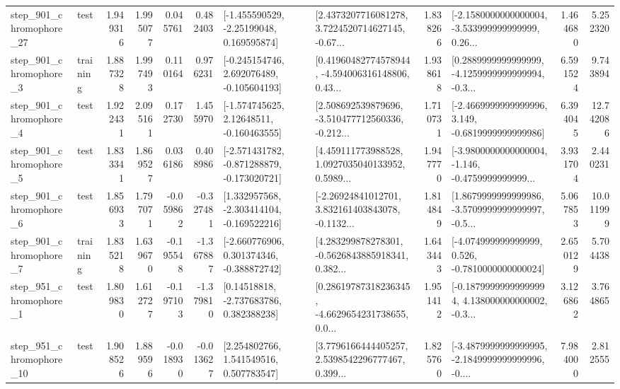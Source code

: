 \begin{tabular}{llrrrrllrlrr}
  step\_901\_chromophore\_27 &      test &      1.949316 &    1.995077 &      0.045761 &  0.482403 &    [-1.455590529, -2.25199048, 0.169595874] &  [2.4373207716081278, 3.7224520714627145, -0.67... &       1.838266 &  [-2.1580000000000004, -3.533999999999999, 0.26... &            1.464680 &          5.252320 \\
   step\_901\_chromophore\_3 &  training &      1.887328 &    1.997493 &      0.110164 &  0.976231 &   [-0.245154746, 2.692076489, -0.105604193] &  [0.41960482774578944, -4.594006316148806, 0.43... &       1.938618 &  [0.2889999999999999, -4.1259999999999994, -0.3... &            6.591524 &          9.743894 \\
   step\_901\_chromophore\_4 &      test &      1.922431 &    2.095161 &      0.172730 &  1.455970 &    [-1.574745625, 2.12648511, -0.160463555] &  [2.508692539879696, -3.510477712560336, -0.212... &       1.710731 &  [-2.4669999999999996, 3.149, -0.6819999999999986] &            6.394045 &         12.742086 \\
   step\_901\_chromophore\_5 &      test &      1.833341 &    1.869527 &      0.036186 &  0.408986 &  [-2.571431782, -0.871288879, -0.173020721] &  [4.459111773988528, 1.0927035040133952, 0.5989... &       1.947770 &  [-3.9800000000000004, -1.146, -0.4759999999999... &            3.931704 &          2.440231 \\
   step\_901\_chromophore\_6 &      test &      1.856933 &    1.797071 &     -0.059862 & -0.327481 &   [1.332957568, -2.303414104, -0.169522216] &  [-2.26924841012701, 3.832161403843078, -0.1132... &       1.814849 &  [1.8679999999999986, -3.5709999999999997, -0.5... &            5.067853 &         10.011999 \\
   step\_901\_chromophore\_7 &  training &      1.835218 &    1.639670 &     -0.195548 & -1.367887 &   [-2.660776906, 0.301374346, -0.388872742] &  [4.283299878278301, -0.5626843885918341, 0.382... &       1.643443 &   [-4.074999999999999, 0.526, -0.7810000000000024] &            2.650129 &          5.704438 \\
   step\_951\_chromophore\_1 &      test &      1.809830 &    1.612727 &     -0.197103 & -1.379810 &     [0.14518818, -2.737683786, 0.382388238] &  [0.28619787318236345, -4.6629654231738655, 0.0... &       1.951412 &  [-0.18799999999999994, 4.138000000000002, -0.3... &            3.126862 &          3.764865 \\
  step\_951\_chromophore\_10 &      test &      1.908526 &    1.889596 &     -0.018930 & -0.013627 &     [2.254802766, 1.541549516, 0.507783547] &  [3.7796166444405257, 2.5398542296777467, 0.399... &       1.825760 &  [-3.4879999999999995, -2.1849999999999996, -0.... &            7.984000 &          2.812555 \\

\end{tabular}
